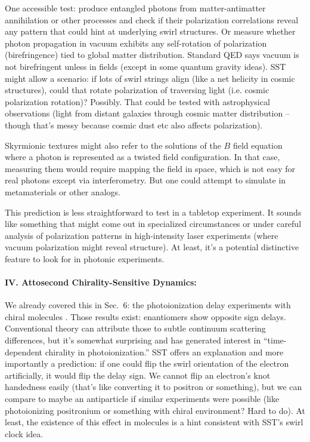 \documentclass[10pt,reprint,aps,onecolumn,nofootinbib]{revtex4-2}
\begin{document}
One accessible test: produce entangled photons from matter-antimatter annihilation or other processes and check if their polarization correlations reveal any pattern that could hint at underlying swirl structures. Or measure whether photon propagation in vacuum exhibits any self-rotation of polarization (birefringence) tied to global matter distribution. Standard QED says vacuum is not birefringent unless in fields (except in some quantum gravity ideas). SST might allow a scenario: if lots of swirl strings align (like a net helicity in cosmic structures), could that rotate polarization of traversing light (i.e. cosmic polarization rotation)? Possibly. That could be tested with astrophysical observations (light from distant galaxies through cosmic matter distribution – though that’s messy because cosmic dust etc also affects polarization).


Skyrmionic textures might also refer to the solutions of the $B$ field equation where a photon is represented as a twisted field configuration. In that case, measuring them would require mapping the field in space, which is not easy for real photons except via interferometry. But one could attempt to simulate in metamaterials or other analogs.


This prediction is less straightforward to test in a tabletop experiment. It sounds like something that might come out in specialized circumstances or under careful analysis of polarization patterns in high-intensity laser experiments (where vacuum polarization might reveal structure). At least, it's a potential distinctive feature to look for in photonic experiments.


\paragraph{IV. Attosecond Chirality-Sensitive Dynamics:}

We already covered this in Sec.~6: the photoionization delay experiments with chiral molecules \cite{Han2025}. Those results exist: enantiomers show opposite sign delays. Conventional theory can attribute those to subtle continuum scattering differences, but it’s somewhat surprising and has generated interest in “time-dependent chirality in photoionization.” SST offers an explanation and more importantly a prediction: if one could flip the swirl orientation of the electron artificially, it would flip the delay sign. We cannot flip an electron’s knot handedness easily (that’s like converting it to positron or something), but we can compare to maybe an antiparticle if similar experiments were possible (like photoionizing positronium or something with chiral environment? Hard to do). At least, the existence of this effect in molecules is a hint consistent with SST’s swirl clock idea.
\end{document}

